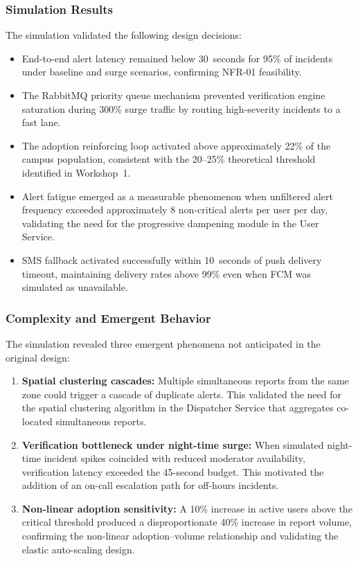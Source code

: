 \documentclass[11pt,a4paper]{article}
\begin{document}
\subsubsection{Simulation Results}

The simulation validated the following design decisions:

\begin{itemize}
\item End-to-end alert latency remained below 30~seconds for 95\% of incidents under baseline and surge scenarios, confirming NFR-01 feasibility.
\item The RabbitMQ priority queue mechanism prevented verification engine saturation during 300\% surge traffic by routing high-severity incidents to a fast lane.
\item The adoption reinforcing loop activated above approximately 22\% of the campus population, consistent with the 20--25\% theoretical threshold identified in Workshop~1.
\item Alert fatigue emerged as a measurable phenomenon when unfiltered alert frequency exceeded approximately 8 non-critical alerts per user per day, validating the need for the progressive dampening module in the User Service.
\item SMS fallback activated successfully within 10~seconds of push delivery timeout, maintaining delivery rates above 99\% even when FCM was simulated as unavailable.
\end{itemize}

\subsubsection{Complexity and Emergent Behavior}

The simulation revealed three emergent phenomena not anticipated in the original design:

\begin{enumerate}
\item \textbf{Spatial clustering cascades:} Multiple simultaneous reports from the same zone could trigger a cascade of duplicate alerts. This validated the need for the spatial clustering algorithm in the Dispatcher Service that aggregates co-located simultaneous reports.

\item \textbf{Verification bottleneck under night-time surge:} When simulated night-time incident spikes coincided with reduced moderator availability, verification latency exceeded the 45-second budget. This motivated the addition of an on-call escalation path for off-hours incidents.

\item \textbf{Non-linear adoption sensitivity:} A 10\% increase in active users above the critical threshold produced a disproportionate 40\% increase in report volume, confirming the non-linear adoption--volume relationship and validating the elastic auto-scaling design.
\end{enumerate}
\end{document}
